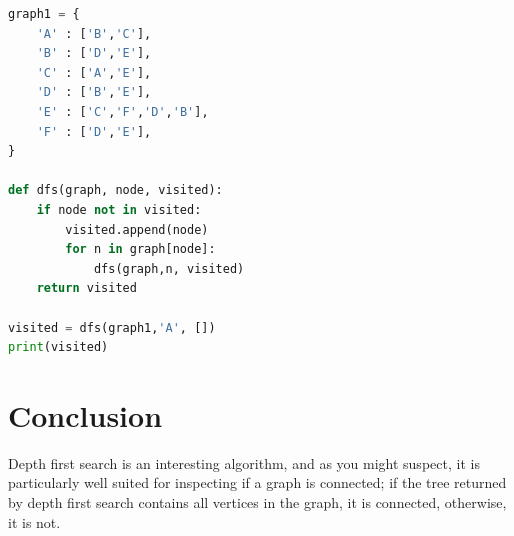\documentclass[11pt]{article}            %
\begin{document}
\begin{lstlisting}[language=Python]
graph1 = {
    'A' : ['B','C'],
    'B' : ['D','E'],
    'C' : ['A','E'],
    'D' : ['B','E'],
    'E' : ['C','F','D','B'],
    'F' : ['D','E'],
}

def dfs(graph, node, visited):
    if node not in visited:
        visited.append(node)
        for n in graph[node]:
            dfs(graph,n, visited)
    return visited

visited = dfs(graph1,'A', [])
print(visited)
\end{lstlisting}
\section{Conclusion}  
Depth first search is an interesting algorithm, and as you might suspect, it is particularly well suited for inspecting if a graph is connected; if the tree returned by depth first search contains all vertices in the graph, it is connected, otherwise, it is not.

 
\end{document}
